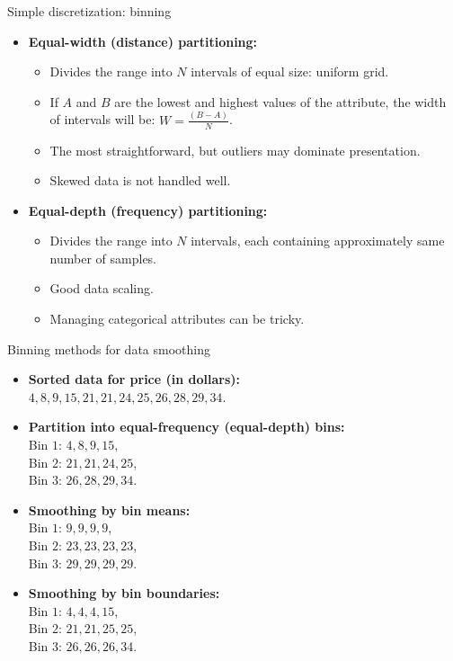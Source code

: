 \documentclass[aspectratio=169,t]{beamer}
\begin{document}
  {
    \begin{frame}{Simple discretization: binning}
    \begin{itemize}
      \item \textbf{Equal-width (distance) partitioning:}
      \begin{itemize}
        \item Divides the range into $N$ intervals of equal size: uniform grid.
        \item If $A$ and $B$ are the lowest and highest values of the attribute, the width of intervals will be: $W = \frac{(B - A)}{N}$.
        \item The most straightforward, but outliers may dominate presentation.
        \item Skewed data is not handled well.
      \end{itemize}
      \item \textbf{Equal-depth (frequency) partitioning:}
      \begin{itemize}
        \item Divides the range into $N$ intervals, each containing approximately same number of samples.
        \item Good data scaling.
        \item Managing categorical attributes can be tricky.
      \end{itemize}
    \end{itemize}
    \end{frame}
  }

  {
    \begin{frame}{Binning methods for data smoothing}
    \begin{itemize}
      \item \textbf{Sorted data for price (in dollars):} \\
            $4, 8, 9, 15, 21, 21, 24, 25, 26, 28, 29, 34$.
      \item \textbf{Partition into equal-frequency (equal-depth) bins:}\\
            Bin $1$: $4, 8, 9, 15$,\\
            Bin $2$: $21, 21, 24, 25$,\\
            Bin $3$: $26, 28, 29, 34$.
      \item \textbf{Smoothing by bin means:}\\
            Bin $1$: $9, 9, 9, 9$,\\
            Bin $2$: $23, 23, 23, 23$,\\
            Bin $3$: $29, 29, 29, 29$.\\
      \item \textbf{Smoothing by bin boundaries:}\\
            Bin $1$: $4, 4, 4, 15$,\\
            Bin $2$: $21, 21, 25, 25$,\\
            Bin $3$: $26, 26, 26, 34$.\\
    \end{itemize}
    \end{frame}
  }
\end{document}
